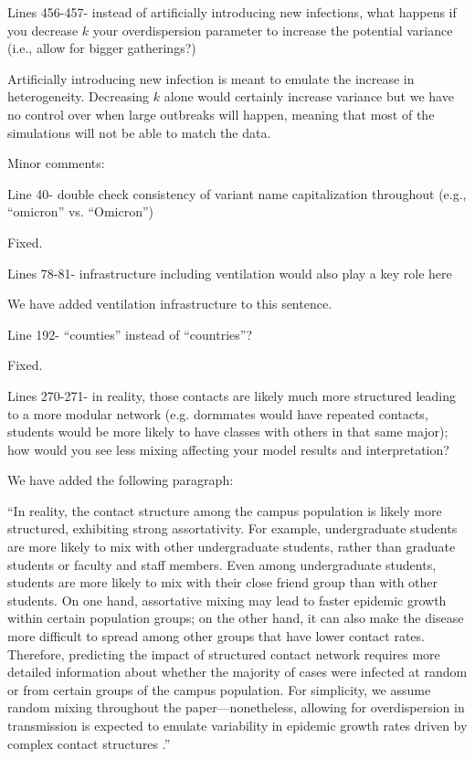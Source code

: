 \documentclass[12pt]{article}
\newcommand{\revtext}{\textsf}
\begin{document}
\revtext{Lines 456-457- instead of artificially introducing new infections, what happens if you decrease $k$ your overdispersion parameter to increase the potential variance (i.e., allow for bigger gatherings?)}

Artificially introducing new infection is meant to emulate the increase in heterogeneity.
Decreasing $k$ alone would certainly increase variance but we have no control over when large outbreaks will happen, meaning that most of the simulations will not be able to match the data.

\revtext{Minor comments:} 

\revtext{Line 40- double check consistency of variant name capitalization throughout (e.g., “omicron” vs. “Omicron”)}

Fixed.

\revtext{Lines 78-81- infrastructure including ventilation would also play a key role here}

We have added ventilation infrastructure to this sentence.

\revtext{Line 192- “counties” instead of “countries”?}

Fixed.

\revtext{Lines 270-271- in reality, those contacts are likely much more structured leading to a more modular network (e.g. dormmates would have repeated contacts, students would be more likely to have classes with others in that same major); how would you see less mixing affecting your model results and interpretation?}

We have added the following paragraph:

``In reality, the contact structure among the campus population is likely more structured, exhibiting strong assortativity.
For example, undergraduate students are more likely to mix with other undergraduate students, rather than graduate students or faculty and staff members.
Even among undergraduate students, students are more likely to mix with their close friend group than with other students.
On one hand, assortative mixing may lead to faster epidemic growth within certain population groups;
on the other hand, it can also make the disease more difficult to spread among other groups that have lower contact rates.
Therefore, predicting the impact of structured contact network requires more detailed information about whether the majority of cases were infected at random or from certain groups of the campus population.
For simplicity, we assume random mixing throughout the paper---nonetheless, allowing for overdispersion in transmission is expected to emulate variability in epidemic growth rates driven by complex contact structures \citep{lloyd2005superspreading}.''
\end{document}

